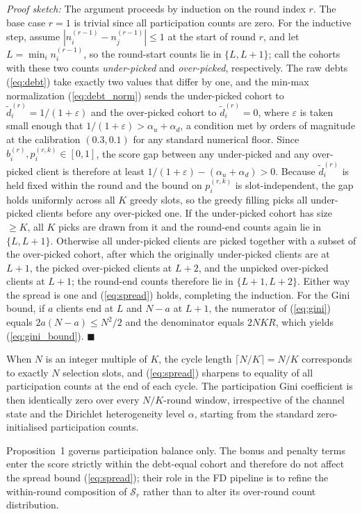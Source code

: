 \documentclass[journal]{IEEEtran}
\newcommand{\revIVE}[1]{#1}
\begin{document}
\textit{Proof sketch:} The argument proceeds by induction on the round index $r$. The base case $r = 1$ is trivial since all participation counts are zero. For the inductive step, assume $|n_i^{(r-1)} - n_j^{(r-1)}| \le 1$ at the start of round $r$, and let $L = \min_i n_i^{(r-1)}$, so the round-start counts lie in $\{L, L+1\}$; call the cohorts with these two counts \emph{under-picked} and \emph{over-picked}, respectively. The raw debts (\ref{eq:debt}) take exactly two values that differ by one, and the min-max normalization (\ref{eq:debt_norm}) sends the under-picked cohort to $\tilde{d}_i^{(r)} = 1/(1+\varepsilon)$ and the over-picked cohort to $\tilde{d}_i^{(r)} = 0$, \revIVE{where $\varepsilon$ is taken small enough that $1/(1+\varepsilon) > \alpha_u + \alpha_d$, a condition met by orders of magnitude at the calibration $(0.3, 0.1)$ for any standard numerical floor.} Since $b_i^{(r)}, p_i^{(r,k)} \in [0,1]$, the score gap between any under-picked and any over-picked client is therefore at least $1/(1+\varepsilon) - (\alpha_u + \alpha_d) > 0$. \revIVE{Because $\tilde{d}_i^{(r)}$ is held fixed within the round and the bound on $p_i^{(r,k)}$ is slot-independent, the gap holds uniformly across all $K$ greedy slots,} so the greedy filling picks all under-picked clients before any over-picked one. If the under-picked cohort has size $\ge K$, all $K$ picks are drawn from it and the round-end counts again lie in $\{L, L+1\}$. Otherwise all under-picked clients are picked together with a subset of the over-picked cohort, after which the originally under-picked clients are at $L+1$, the picked over-picked clients at $L+2$, and the unpicked over-picked clients at $L+1$; the round-end counts therefore lie in $\{L+1, L+2\}$. Either way the spread is one and (\ref{eq:spread}) holds, completing the induction. For the Gini bound, if $a$ clients end at $L$ and $N-a$ at $L+1$, the numerator of (\ref{eq:gini}) equals $2a(N-a) \le N^2/2$ and the denominator equals $2NKR$, which yields (\ref{eq:gini_bound}). \hfill$\blacksquare$

When $N$ is an integer multiple of $K$, the cycle length $\lceil N/K \rceil = N/K$ corresponds to exactly $N$ selection slots, and (\ref{eq:spread}) sharpens to equality of all participation counts at the end of each cycle. The participation Gini coefficient is then identically zero over every $N/K$-round window, irrespective of the channel state and the Dirichlet heterogeneity level $\alpha$, starting from the standard zero-initialised participation counts.

Proposition~1 governs participation balance only. The bonus and penalty terms enter the score strictly within the debt-equal cohort and therefore do not affect the spread bound (\ref{eq:spread}); their role in the FD pipeline is to refine the within-round composition of $\mathcal{S}_r$ rather than to alter its over-round count distribution. %
\end{document}
